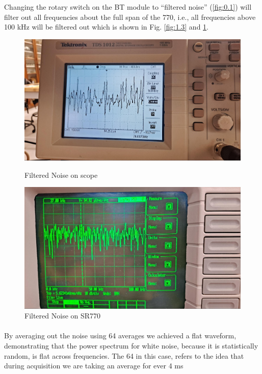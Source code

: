 \documentclass[../main.tex]{subfiles}
\begin{document}
Changing the rotary switch on the BT module to ``filtered noise'' (\ref{fig:0.1}) will
filter out all frequencies about the full span of the 770, i.e., all frequencies above 100 kHz will be filtered out which is shown in Fig. \ref{fig:1.3} and \ref{fig:1.4}.

\begin{figure}[ht]
    \centering
    \begin{minipage}{0.5\textwidth}
        \centering
        \includegraphics[width=\textwidth]{fig1_3.jpg}
        \caption{Filtered Noise on scope}
        \label{fig:1.3}
    \end{minipage}\hfill
    \begin{minipage}{0.5\textwidth}
        \centering
        \includegraphics[width=\textwidth]{fig1_4.jpg}
        \caption{Filtered Noise on SR770}
        \label{fig:1.4}
    \end{minipage}
\end{figure}

\newpage
\paragraph*{}
By averaging out the noise using 64 averages we achieved a flat waveform, demonstrating that the power spectrum for white noise, because it is statistically random, is flat across frequencies.
The 64 in this case, refers to the idea that during acquisition we are taking an average for ever 4 ms
\end{document}
